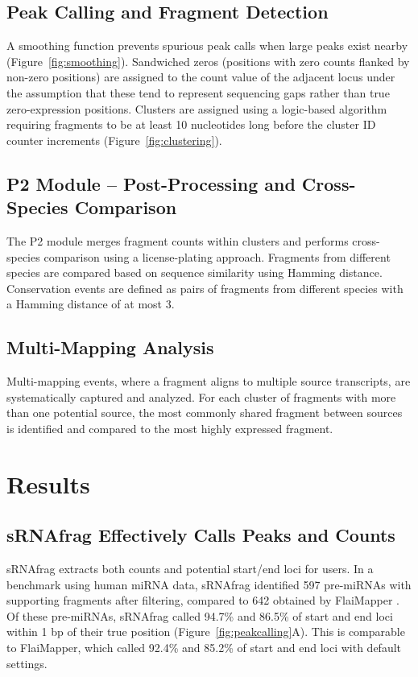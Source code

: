 \documentclass[11pt]{article}
\begin{document}
\subsection{Peak Calling and Fragment Detection}

A smoothing function prevents spurious peak calls when large peaks exist nearby (Figure~\ref{fig:smoothing}). Sandwiched zeros (positions with zero counts flanked by non-zero positions) are assigned to the count value of the adjacent locus under the assumption that these tend to represent sequencing gaps rather than true zero-expression positions. Clusters are assigned using a logic-based algorithm requiring fragments to be at least 10 nucleotides long before the cluster ID counter increments (Figure~\ref{fig:clustering}).

\subsection{P2 Module -- Post-Processing and Cross-Species Comparison}

The P2 module merges fragment counts within clusters and performs cross-species comparison using a license-plating approach. Fragments from different species are compared based on sequence similarity using Hamming distance. Conservation events are defined as pairs of fragments from different species with a Hamming distance of at most 3.

\subsection{Multi-Mapping Analysis}

Multi-mapping events, where a fragment aligns to multiple source transcripts, are systematically captured and analyzed. For each cluster of fragments with more than one potential source, the most commonly shared fragment between sources is identified and compared to the most highly expressed fragment.

\section{Results}

\subsection{sRNAfrag Effectively Calls Peaks and Counts}

sRNAfrag extracts both counts and potential start/end loci for users. In a benchmark using human miRNA data, sRNAfrag identified 597 pre-miRNAs with supporting fragments after filtering, compared to 642 obtained by FlaiMapper \citep{Hoogstrate2015}. Of these pre-miRNAs, sRNAfrag called 94.7\% and 86.5\% of start and end loci within 1 bp of their true position (Figure~\ref{fig:peakcalling}A). This is comparable to FlaiMapper, which called 92.4\% and 85.2\% of start and end loci with default settings.
\end{document}
